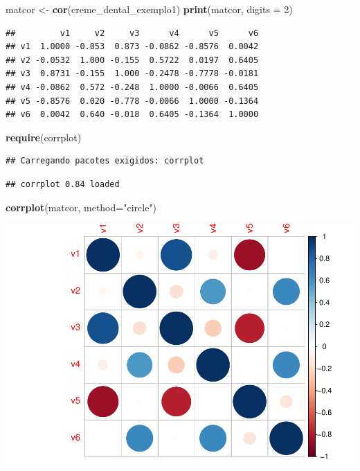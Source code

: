 \documentclass[12pt,brazil,]{book}
\newenvironment{Shaded}{\begin{snugshade}}{\end{snugshade}}
\newcommand{\DataTypeTok}[1]{\textcolor[rgb]{0.13,0.29,0.53}{#1}}
\newcommand{\DecValTok}[1]{\textcolor[rgb]{0.00,0.00,0.81}{#1}}
\newcommand{\KeywordTok}[1]{\textcolor[rgb]{0.13,0.29,0.53}{\textbf{#1}}}
\newcommand{\NormalTok}[1]{#1}
\newcommand{\StringTok}[1]{\textcolor[rgb]{0.31,0.60,0.02}{#1}}
\begin{document}
\begin{Shaded}
\begin{Highlighting}[]
\NormalTok{matcor <-}\StringTok{ }\KeywordTok{cor}\NormalTok{(creme_dental_exemplo1)}
\KeywordTok{print}\NormalTok{(matcor, }\DataTypeTok{digits =} \DecValTok{2}\NormalTok{)}
\end{Highlighting}
\end{Shaded}

\begin{verbatim}
##         v1     v2     v3      v4      v5      v6
## v1  1.0000 -0.053  0.873 -0.0862 -0.8576  0.0042
## v2 -0.0532  1.000 -0.155  0.5722  0.0197  0.6405
## v3  0.8731 -0.155  1.000 -0.2478 -0.7778 -0.0181
## v4 -0.0862  0.572 -0.248  1.0000 -0.0066  0.6405
## v5 -0.8576  0.020 -0.778 -0.0066  1.0000 -0.1364
## v6  0.0042  0.640 -0.018  0.6405 -0.1364  1.0000
\end{verbatim}

\begin{Shaded}
\begin{Highlighting}[]
\KeywordTok{require}\NormalTok{(corrplot)}
\end{Highlighting}
\end{Shaded}

\begin{verbatim}
## Carregando pacotes exigidos: corrplot
\end{verbatim}

\begin{verbatim}
## corrplot 0.84 loaded
\end{verbatim}

\begin{Shaded}
\begin{Highlighting}[]
\KeywordTok{corrplot}\NormalTok{(matcor, }\DataTypeTok{method=}\StringTok{"circle"}\NormalTok{)}
\end{Highlighting}
\end{Shaded}

\includegraphics{03-AnaliseFat_files/figure-latex/unnamed-chunk-3-1.pdf}
\end{document}
